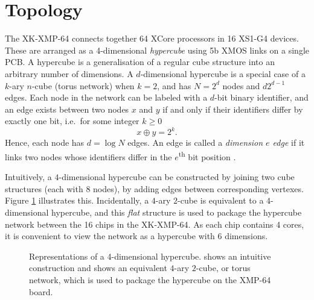 \section{Topology\label{sec:topology}}

The XK-XMP-64 connects together 64 XCore processors in 16 XS1-G4 devices. These
are arranged as a 4-dimensional \emph{hypercube} using 5b XMOS links on a single
PCB. A hypercube is a generalisation of a regular cube structure into an
arbitrary number of dimensions. A $d$-dimensional hypercube is a special case of
a $k$-ary $n$-cube (torus network) when $k = 2$, and has $N = 2^d$ nodes and
$d2^{d-1}$ edges. Each node in the network can be labeled with a $d$-bit binary
identifier, and an edge exists between two nodes $x$ and $y$ if and only if
their identifiers differ by exactly one bit, i.e.\ for some integer $k\geq0$
$$x\oplus y=2^k.$$ Hence, each node has $d = \log N$ edges. An edge is called a
\emph{dimension $e$ edge} if it links two nodes whose identifiers differ in the
$e$\textsuperscript{th} bit position \cite{leighton92}.

Intuitively, a $4$-dimensional hypercube can be constructed by joining two cube
structures (each with $8$ nodes), by adding edges between corresponding
vertexes.  Figure \ref{fig:hypercube} illustrates this.  Incidentally, a $4$-ary
$2$-cube is equivalent to a $4$-dimensional hypercube, and this \emph{flat}
structure is used to package the hypercube network between the 16 chips in the
XK-XMP-64. As each chip contains 4 cores, it is convenient to view the network
as a hypercube with 6 dimensions. 

\begin{figure}[ht]
\centering
{}
\hspace{10mm}
\caption{Representations of a 4-dimensional hypercube. \protect{}
shows an intuitive construction and \protect{} shows an equivalent
$4$-ary $2$-cube, or torus network, which is used to package the hypercube on
the XMP-64 board.}
\label{fig:hypercube}
\end{figure}

